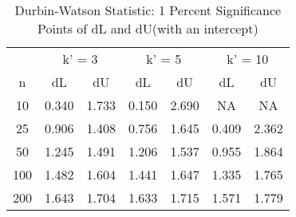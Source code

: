 \documentclass{article}
\theoremstyle{definition}
\begin{document}
\begin{table}[htb] \centering 
	\caption{Durbin-Watson Statistic: 1 Percent Significance Points of dL and dU(with an intercept)} 
	\label{DWintercept} 
	\small 
	\begin{tabular}{@{}ccccccc@{}}
		\cmidrule(r){1-7}
		& \multicolumn{2}{c}{k' = 3}                  & \multicolumn{2}{c}{k' = 5}                  & \multicolumn{2}{c}{k' = 10}                 \\ \cmidrule(r){1-7}
		n                    & dL                   & dU                   & dL                   & dU                   & dL                   & dU                   \\
		10                   & 0.340                & 1.733                & 0.150                & 2.690                & NA                   & NA                   \\
		25                   & 0.906                & 1.408                & 0.756                & 1.645                & 0.409                & 2.362                \\
		50                   & 1.245                & 1.491                & 1.206                & 1.537                & 0.955                & 1.864                \\
		100                  & 1.482                & 1.604                & 1.441                & 1.647                & 1.335                & 1.765                \\
		200                  & 1.643                & 1.704                & 1.633                & 1.715                & 1.571                & 1.779                \\ \cmidrule(r){1-7}
	\end{tabular}
\end{table}
\end{document}
